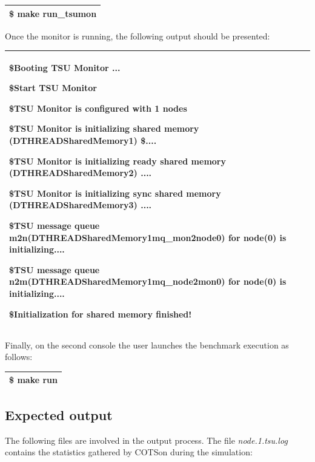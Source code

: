 \documentclass[a4paper]{article}
\begin{document}
\begin{flushleft}
\tablehead{}
\begin{supertabular}{|m{6.34626in}|}
\hline
{}\ttfamily \$ make run\_tsumon\\\hline
\end{supertabular}
\end{flushleft}
{
Once the monitor is running, the following output should be presented:}

\begin{flushleft}
\tablehead{}
\begin{supertabular}{|m{6.34626in}|}
\hline
{\ttfamily \$Booting TSU Monitor
...}

{\ttfamily \$Start TSU Monitor}

{\ttfamily \$TSU Monitor is
configured with 1 nodes}

{\ttfamily \$TSU Monitor is
initializing shared memory (DTHREADSharedMemory1) \$....}

{\ttfamily \$TSU Monitor is
initializing ready shared memory (DTHREADSharedMemory2) ....}

{\ttfamily \$TSU Monitor is
initializing sync shared memory (DTHREADSharedMemory3) ....}

{\ttfamily \$TSU message queue
m2n(DTHREADSharedMemory1mq\_mon2node0) for node(0) is initializing....}

{\ttfamily \$TSU message queue
n2m(DTHREADSharedMemory1mq\_node2mon0) for node(0) is initializing....}

\ttfamily \$Initialization for
shared memory finished!\\\hline
\end{supertabular}
\end{flushleft}
{
Finally, on the second console the user launches the benchmark execution
as follows:}

\begin{flushleft}
\tablehead{}
\begin{supertabular}{|m{6.34626in}|}
\hline
{}\ttfamily \$ make run\\\hline
\end{supertabular}
\end{flushleft}
\subsection[Expected output]{Expected output}
{
The following files are involved in the output process. The file
\textit{node.1.tsu.log }contains the statistics gathered by COTSon
during the simulation:}
\end{document}
